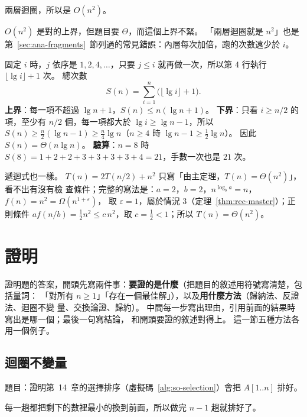 \begin{exmbad}
兩層迴圈，所以是 $O(n^2)$。
\end{exmbad}

$O(n^2)$ 是對的上界，但題目要 $\Theta$，而這個上界不緊。 「兩層迴圈就是 $n^2$」也是
第~\ref{sec:ana-fragments}~節列過的常見錯誤：內層每次加倍，跑的次數遠少於 $i$。

\begin{exmgood}
固定 $i$ 時，$j$ 依序是 $1, 2, 4, \ldots$，只要 $j \le i$ 就再做一次，所以第 4 行執行
$\lfloor \lg i \rfloor + 1$ 次。 總次數
\[
S(n) = \sum_{i=1}^{n} \bigl(\lfloor \lg i \rfloor + 1\bigr).
\]
\textbf{上界}：每一項不超過 $\lg n + 1$，$S(n) \le n(\lg n + 1)$。 \textbf{下界}：只看
$i \ge n/2$ 的項，至少有 $n/2$ 個，每一項都大於 $\lg i \ge \lg n - 1$，所以
$S(n) \ge \frac{n}{2}(\lg n - 1) \ge \frac{n}{4} \lg n$（$n \ge 4$ 時 $\lg n - 1 \ge
\frac12 \lg n$）。 因此 $S(n) = \Theta(n \lg n)$。 \textbf{驗算}：$n = 8$ 時
$S(8) = 1 + 2 + 2 + 3 + 3 + 3 + 3 + 4 = 21$，手數一次也是 $21$ 次。
\end{exmgood}

遞迴式也一樣。 $T(n) = 2T(n/2) + n^2$ 只寫「由主定理，$T(n) = \Theta(n^2)$」，看不出有沒有檢
查條件；完整的寫法是：$a = 2$，$b = 2$，$n^{\log_b a} = n$，$f(n) = n^2 = \Omega(n^{1 + \varepsilon})$，
取 $\varepsilon = 1$，屬於情況 3（定理~\ref{thm:rec-master}）；正則條件 $a f(n/b) = \frac12 n^2
\le c\, n^2$，取 $c = \frac12 < 1$；所以 $T(n) = \Theta(n^2)$。

\section{證明}
\label{sec:exm-proof}

證明題的答案，開頭先寫兩件事：\textbf{要證的是什麼}（把題目的敘述用符號寫清楚，包括量詞：
「對所有 $n \ge 1$」「存在一個最佳解」），以及\textbf{用什麼方法}（歸納法、反證法、迴圈不變
量、交換論證、歸約）。 中間每一步寫出理由，引用前面的結果時寫出是哪一個；最後一句寫結論，
和開頭要證的敘述對得上。 這一節五種方法各用一個例子。

\subsection{迴圈不變量}
\label{sec:exm-invariant}

題目：證明第~14~章的選擇排序（虛擬碼~\ref{alg:so-selection}）會把 $A[1..n]$ 排好。

\begin{exmbad}
每一趟都把剩下的數裡最小的換到前面，所以做完 $n - 1$ 趟就排好了。
\end{exmbad}

